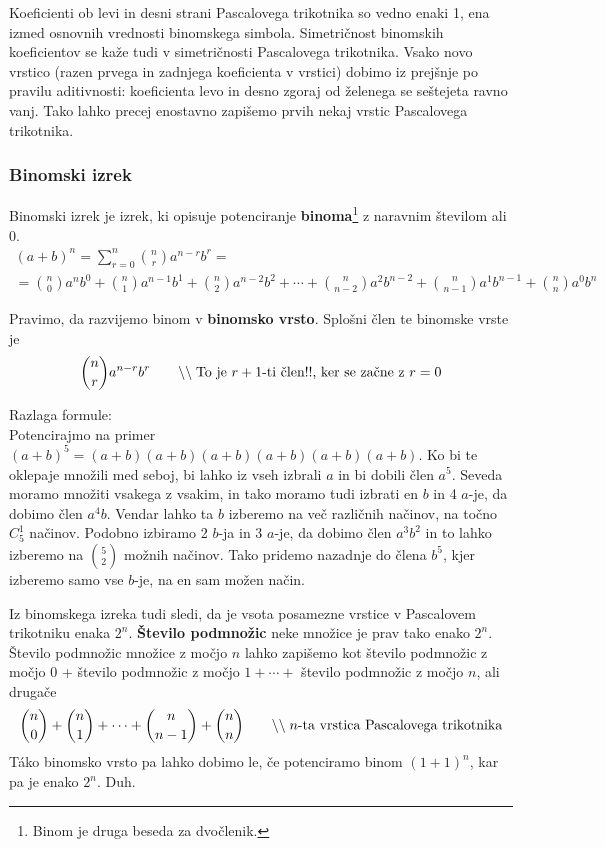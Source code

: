 \documentclass[a4paper,oneside,12pt,fleqn]{article}
\newcommand{\comment}[1]{\ensuremath{\qquad\backslash\backslash\;}\textnormal{#1}}
\numberwithin{equation}{section}
\begin{document}




Koeficienti ob levi in desni strani Pascalovega trikotnika so vedno enaki 1, ena izmed osnovnih
vrednosti binomskega simbola. Simetričnost binomskih koeficientov se kaže tudi v simetričnosti
Pascalovega trikotnika. Vsako novo vrstico (razen prvega in zadnjega koeficienta v vrstici) dobimo iz prejšnje
po pravilu aditivnosti: koeficienta levo in desno zgoraj od želenega se seštejeta ravno vanj. Tako
lahko precej enostavno zapišemo prvih nekaj vrstic Pascalovega trikotnika.

\subsubsection{Binomski izrek}
\label{sec:komb:bin:bin}
Binomski izrek je izrek, ki opisuje potenciranje \textbf{binoma}\footnote{Binom je druga beseda za
dvočlenik.} z naravnim številom ali 0.
\begin{gather*}
  (a+b)^n = \sum_{r=0}^n\binom{n}{r}a^{n-r}b^r = \\
  = \textstyle \binom{n}{0}a^nb^0 + \binom{n}{1}a^{n-1}b^1 + \binom{n}{2}a^{n-2}b^2 + \cdots +
  \binom{n}{n-2}a^2b^{n-2} + \binom{n}{n-1}a^1b^{n-1} + \binom{n}{n}a^0b^n
\end{gather*}

Pravimo, da razvijemo binom v \textbf{binomsko vrsto}. Splošni člen te binomske vrste je
\[ \binom{n}{r}a^{n-r}b^r \comment{To je $r+1$-ti člen!!, ker se začne z $r = 0$} \]

Razlaga formule:\\
Potencirajmo na primer $(a+b)^5 = (a+b)(a+b)(a+b)(a+b)(a+b)(a+b)$. Ko bi te oklepaje množili med
seboj, bi lahko iz vseh izbrali $a$ in bi dobili člen $a^5$. Seveda moramo množiti vsakega z vsakim,
in tako moramo tudi izbrati en $b$ in 4 $a$-je, da dobimo člen $a^4b$. Vendar lahko ta $b$ izberemo
na več različnih načinov, na točno $C^1_5$ načinov. Podobno izbiramo 2 $b$-ja in 3 $a$-je, da dobimo
člen $a^3b^2$ in to lahko izberemo na $\binom{5}{2}$ možnih načinov. Tako pridemo nazadnje do člena
$b^5$, kjer izberemo samo vse $b$-je, na en sam možen način.

Iz binomskega izreka tudi sledi, da je vsota posamezne vrstice v Pascalovem trikotniku enaka $2^n$.
\textbf{Število podmnožic} neke množice je prav tako enako $2^n$. Število podmnožic množice z močjo $n$ lahko
zapišemo kot število podmnožic z močjo 0 + število podmnožic z močjo $1 + \cdots + $ število
podmnožic z močjo $n$, ali drugače
\[ \binom{n}{0} + \binom{n}{1} + \cdots + \binom{n}{n-1} + \binom{n}{n} \comment{$n$-ta
vrstica Pascalovega trikotnika} \]
T\'{a}ko binomsko vrsto pa lahko dobimo le, če potenciramo binom $(1+1)^n$, kar pa je enako $2^n$. Duh.
\end{document}
